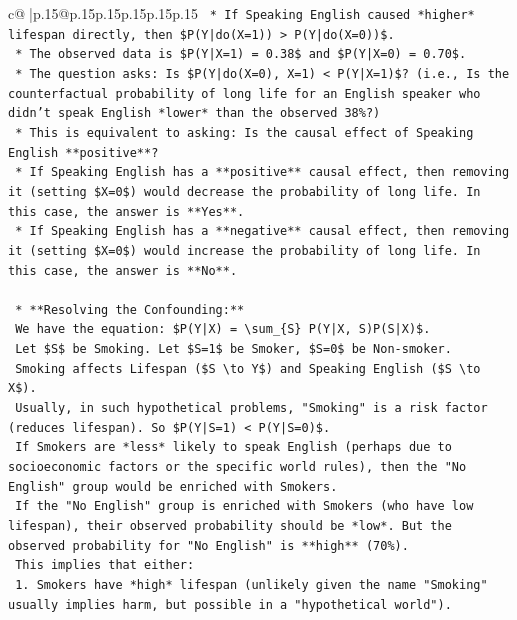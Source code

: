 \documentclass{article}
\begin{document}
{\begin{supertabular}{c@{$\;$}|p{.15\linewidth}@{}p{.15\linewidth}p{.15\linewidth}p{.15\linewidth}p{.15\linewidth}p{.15\linewidth}}
{{{\texttt{        *   If Speaking English caused *higher* lifespan directly, then \$P(Y|do(X=1)) > P(Y|do(X=0))\$.} \\
\texttt{    *   The observed data is \$P(Y|X=1) = 0.38\$ and \$P(Y|X=0) = 0.70\$.} \\
\texttt{    *   The question asks: Is \$P(Y|do(X=0), X=1) < P(Y|X=1)\$? (i.e., Is the counterfactual probability of long life for an English speaker who didn't speak English *lower* than the observed 38\%?)} \\
\texttt{    *   This is equivalent to asking: Is the causal effect of Speaking English **positive**?} \\
\texttt{        *   If Speaking English has a **positive** causal effect, then removing it (setting \$X=0\$) would decrease the probability of long life. In this case, the answer is **Yes**.} \\
\texttt{        *   If Speaking English has a **negative** causal effect, then removing it (setting \$X=0\$) would increase the probability of long life. In this case, the answer is **No**.} \\
\\ 
\texttt{    *   **Resolving the Confounding:**} \\
\texttt{        We have the equation: \$P(Y|X) = \textbackslash{}sum\_\{S\} P(Y|X, S)P(S|X)\$.} \\
\texttt{        Let \$S\$ be Smoking. Let \$S=1\$ be Smoker, \$S=0\$ be Non{-}smoker.} \\
\texttt{        Smoking affects Lifespan (\$S \textbackslash{}to Y\$) and Speaking English (\$S \textbackslash{}to X\$).} \\
\texttt{        Usually, in such hypothetical problems, "Smoking" is a risk factor (reduces lifespan). So \$P(Y|S=1) < P(Y|S=0)\$.} \\
\texttt{        If Smokers are *less* likely to speak English (perhaps due to socioeconomic factors or the specific world rules), then the "No English" group would be enriched with Smokers.} \\
\texttt{        If the "No English" group is enriched with Smokers (who have low lifespan), their observed probability should be *low*. But the observed probability for "No English" is **high** (70\%).} \\
\texttt{        This implies that either:} \\
\texttt{        1.  Smokers have *high* lifespan (unlikely given the name "Smoking" usually implies harm, but possible in a "hypothetical world").} \\
}}}
\end{supertabular}}
\end{document}
